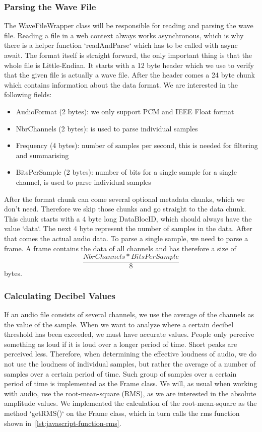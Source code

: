 \subsubsection{Parsing the Wave File}
The WaveFileWrapper class will be responsible for reading and parsing the wave file.
Reading a file in a web context always works asynchronous, which is why there is a helper function `readAndParse` which has to be called with async await.
The format itself is straight forward\cite{wav_file_format_wikipedia}, the only important thing is that the whole file is Little-Endian.
It starts with a 12 byte header which we use to verify that the given file is actually a wave file.
After the header comes a 24 byte chunk which contains information about the data format.
We are interested in the following fields:
\begin{itemize}
    \item AudioFormat (2 bytes): we only support PCM and IEEE Float format
    \item NbrChannels (2 bytes): is used to parse individual samples
    \item Frequency (4 bytes): number of samples per second, this is needed for filtering and summarising
    \item BitsPerSample (2 bytes): number of bits for a single sample for a single channel, is used to parse individual samples
\end{itemize}
After the format chunk can come several optional metadata chunks, which we don't need. Therefore we skip those chunks and go straight to the data chunk.
This chunk starts with a 4 byte long DataBlocID, which should always have the value `data`.
The next 4 byte represent the number of samples in the data.
After that comes the actual audio data.
To parse a single sample, we need to parse a frame.
A frame contains the data of all channels and has therefore a size of \[\frac{NbrChannels * BitsPerSample}{8}\] bytes.

\subsubsection{Calculating Decibel Values}
If an audio file consists of several channels, we use the average of the channels as the value of the sample.
When we want to analyze where a certain decibel threshold has been exceeded, we must have accurate values.
People only perceive something as loud if it is loud over a longer period of time.
Short peaks are perceived less.
Therefore, when determining the effective loudness of audio, we do not use the loudness of individual samples,
but rather the average of a number of samples over a certain period of time.
Such group of samples over a certain period of time is implemented as the Frame class.
We will, as usual when working with audio, use the root-mean-square (RMS),
as we are interested in the absolute amplitude values.
We implemented the calculation of the root-mean-square as the method `getRMS()` on the Frame class,
which in turn calls the rms function shown in~\ref{lst:javascript-function-rms}.

